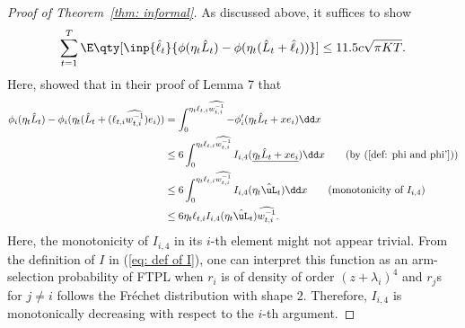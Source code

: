 \begin{proof}[Proof of Theorem~\ref{thm: informal}]
    As discussed above, it suffices to show 
    \begin{equation*}
        \sum_{t=1}^T \E \qty[\inp{\hat{\ell}_t}{\phi(\eta_t \hat{L}_t)-\phi(\eta_t (\hat{L}_t+\hat{\ell}_t))}] \leq 11.5c\sqrt{\pi KT}.
    \end{equation*}
    Here, \citet{pmlr-v201-honda23a} showed that in their proof of Lemma 7 that
    \begin{align*}
        \phi_i(\eta_t \hat{L}_t) - \phi_i(\eta_t (\hat{L}_t+(\ell_{t,i}\widehat{w_{t,i}^{-1}})e_i)) &= \int_0^{\eta_t \ell_{t,i}\widehat{w_{t,i}^{-1}} } -\phi_i'(\eta_t \hat{L}_t + xe_i) \dd x \\
        &\leq 6 \int_0^{\eta_t \ell_{t,i}\widehat{w_{t,i}^{-1}} } I_{i,4}(\underline{\eta_t \hat{L}_t + xe_i}) \dd x \tag{by (\ref{def: phi and phi'})} \\
        &\leq 6 \int_0^{\eta_t \ell_{t,i}\widehat{w_{t,i}^{-1}} } I_{i,4}(\eta_t \hat{\uL}_t) \dd x \tag{monotonicity of $I_{i,4}$} \\
        &\leq 6 \eta_t \ell_{t,i}  I_{i,4}(\eta_t \hat{\uL}_t)  \widehat{w_{t,i}^{-1}}.
    \end{align*}
    Here, the monotonicity of $I_{i,4}$ in its $i$-th element might not appear trivial.
    From the definition of $I$ in (\ref{eq: def of I}), one can interpret this function as an arm-selection probability of FTPL when $r_i$ is of density of order $(z+\lambda_i)^4$ and $r_j$s for $j\ne i$ follows the Fr\'echet distribution with shape $2$.
    Therefore, $I_{i,4}$ is monotonically decreasing with respect to the $i$-th argument.
    

\end{proof}
